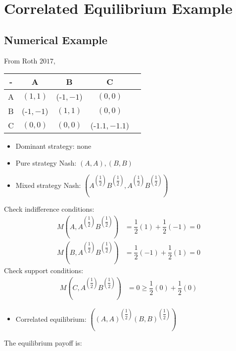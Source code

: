 \documentclass{article}
\begin{document}
\section{Correlated Equilibrium Example} 

\subsection{Numerical Example}
From Roth $2017$,
\begin{center} \begin{tabular}{|c|c|c|c|c|}
\hline
 - &A &B &C\\ \hline
A &$\left(1, 1\right)$ &(-$1, -1$) &$\left(0, 0\right)$\\ \hline
B &(-$1, -1$) &$\left(1, 1\right)$ &$\left(0, 0\right)$\\ \hline
C &$\left(0, 0\right)$ &$\left(0, 0\right)$ &(-$1.1, -1.1$)\\ \hline
\end{tabular} \end{center}
\begin{itemize}
\item Dominant strategy: none
\item Pure strategy Nash: $\left(A , A \right), \left(B , B \right)$
\item Mixed strategy Nash: $\left(A^{\left(\dfrac{1}{2}\right)}B^{\left(\dfrac{1}{2}\right)}, A^{\left(\dfrac{1}{2}\right)}B^{\left(\dfrac{1}{2}\right)}\right)$
\end{itemize}Check indifference conditions:
\begin{align*}
M\left(A, A^{\left(\dfrac{1}{2}\right)}B^{\left(\dfrac{1}{2}\right)}\right)  &= \dfrac{1}{2} \left(1\right) + \dfrac{1}{2} \left(-1\right) = 0
\\ M\left(B, A^{\left(\dfrac{1}{2}\right)}B^{\left(\dfrac{1}{2}\right)}\right)  &= \dfrac{1}{2} \left(-1\right) + \dfrac{1}{2} \left(1\right) = 0
\end{align*}
Check support conditions:
\begin{align*}
M\left(C, A^{\left(\dfrac{1}{2}\right)}B^{\left(\dfrac{1}{2}\right)}\right)  &= 0 \geq  \dfrac{1}{2} \left(0\right) + \dfrac{1}{2} \left(0\right)
\end{align*}
\begin{itemize}
\item Correlated equilibrium: $\left(\left(A,A \right)^{\left(\dfrac{1}{2}\right)}\left(B,B\right)^{\left(\dfrac{1}{2}\right)}\right)$
\end{itemize}The equilibrium payoff is:
\end{document}
